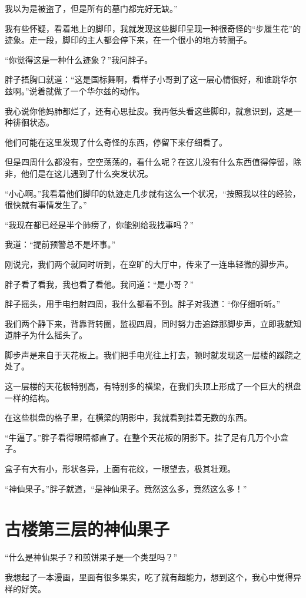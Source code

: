 我以为是被盗了，但是所有的墓门都完好无缺。”

我有些怀疑，看着地上的脚印，我就发现这些脚印呈现一种很奇怪的“步履生花”的迹象。走一段，脚印的主人都会停下来，在一个很小的地方转圈子。

“你觉得这是一种什么迹象？”我问胖子。

胖子捂胸口就道：“这是国标舞啊，看样子小哥到了这一层心情很好，和谁跳华尔兹啊。”说着就做了一个华尔兹的动作。

我心说你他妈肺都烂了，还有心思扯皮。我再低头看这些脚印，就意识到，这是一种徘徊状态。

他们可能在这里发现了什么奇怪的东西，停留下来仔细看了。

但是四周什么都没有，空空荡荡的，看什么呢？在这儿没有什么东西值得停留，除非，他们是在这儿遇到了什么突发状况。

“小心啊。”我看着他们脚印的轨迹走几步就有这么一个状况，“按照我以往的经验，很快就有事情发生了。”

“我现在都已经是半个肺痨了，你能别给我找事吗？”

我道：“提前预警总不是坏事。”

刚说完，我们两个就同时听到，在空旷的大厅中，传来了一连串轻微的脚步声。

胖子看了看我，我也看了看他。我问道：“是小哥？”

胖子摇头，用手电扫射四周，我什么都看不到。胖子对我道：“你仔细听听。”

我们两个静下来，背靠背转圈，监视四周，同时努力击追踪那脚步声，立即我就知道胖子为什么摇头了。

脚步声是来自于天花板上。我们把手电光往上打去，顿时就发现这一层楼的蹊跷之处了。

这一层楼的天花板特别高，有特别多的横梁，在我们头顶上形成了一个巨大的棋盘一样的结构。

在这些棋盘的格子里，在横梁的阴影中，我就看到挂着无数的东西。

“牛逼了。”胖子看得眼睛都直了。在整个天花板的阴影下。挂了足有几万个小盒子。

盒子有大有小，形状各异，上面有花纹，一眼望去，极其壮观。

“神仙果子。”胖子就道，“是神仙果子。竟然这么多，竟然这么多！”

\chapter{古楼第三层的神仙果子}

“什么是神仙果子？和煎饼果子是一个类型吗？”

我想起了一本漫画，里面有很多果实，吃了就有超能力，想到这个，我心中觉得异样的好笑。


